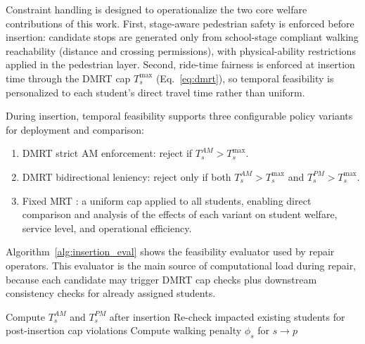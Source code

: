\documentclass[journal]{IEEEtran}
\begin{document}
Constraint handling is designed to operationalize the two core 
welfare contributions of this work. First, stage-aware 
pedestrian safety is enforced before insertion: candidate stops 
are generated only from school-stage compliant walking 
reachability (distance and crossing permissions), with 
physical-ability restrictions applied in the pedestrian 
layer. Second, ride-time fairness is enforced at 
insertion time through the DMRT cap $T^{\max}_s$ 
(Eq.~\ref{eq:dmrt}), so temporal feasibility is personalized 
to each student's direct travel time rather than uniform.

During insertion, temporal feasibility supports three configurable 
policy variants for deployment and comparison:
\begin{enumerate}
    \item[(i)] DMRT strict AM enforcement: reject if 
    $T^{AM}_s > T^{\max}_s$.
    \item[(ii)] DMRT bidirectional leniency: reject only if both 
    $T^{AM}_s > T^{\max}_s$ and $T^{PM}_s > T^{\max}_s$.
    \item[(iii)] Fixed MRT \cite{c3}: a uniform cap applied to 
    all students, enabling direct comparison and analysis of the 
    effects of each variant on student welfare, service level, 
    and operational efficiency.
\end{enumerate}

Algorithm~\ref{alg:insertion_eval} shows the feasibility evaluator 
used by repair operators. This evaluator is the main source of 
computational load during repair, because each candidate may 
trigger DMRT cap checks plus downstream consistency checks for 
already assigned students.

\begin{algorithm}[!t]
\caption{Feasibility-Aware Insertion Evaluation}
\label{alg:insertion_eval}
Compute $T_s^{AM}$ and $T_s^{PM}$ after insertion\;
Re-check impacted existing students for post-insertion cap 
violations\;
Compute walking penalty $\phi_s$ for $s \rightarrow p$\;
\;
\end{algorithm}
\end{document}
